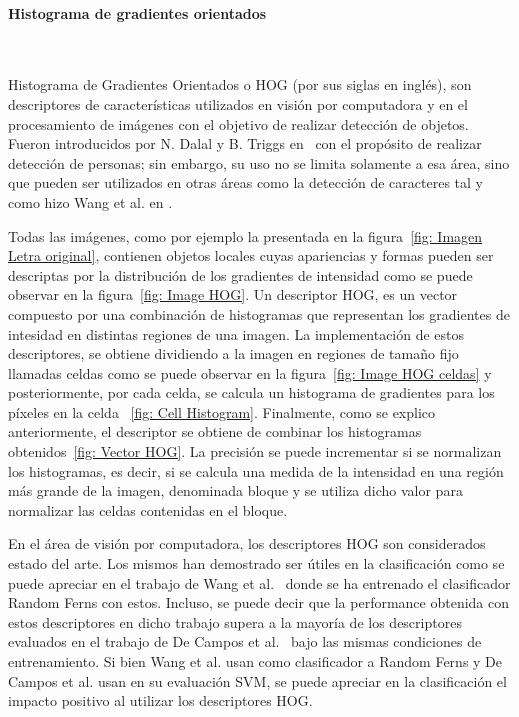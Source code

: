 \paragraph{Histograma de gradientes orientados} ~\\
\label{subsection:hog}

	Histograma de Gradientes Orientados o HOG (por sus siglas en inglés), son descriptores de características utilizados en visión por computadora y en el procesamiento de imágenes con el objetivo de realizar detección de objetos. Fueron introducidos por N. Dalal y B. Triggs en~\cite{DT05} con el propósito de realizar detección de personas; sin embargo, su uso no se limita solamente a esa área, sino que pueden ser utilizados en otras áreas como la detección de caracteres tal y como hizo Wang et al. en \cite{wang}.
	
	Todas las imágenes, como por ejemplo la presentada en la figura~\ref{fig: Imagen Letra original}, contienen objetos locales cuyas apariencias y formas pueden ser descriptas por la distribución de los gradientes de intensidad como se puede observar en la figura~\ref{fig: Image HOG}.	Un descriptor HOG, es un vector compuesto por una combinación de histogramas que representan los gradientes de intesidad en distintas regiones de una imagen. La implementación de estos descriptores, se obtiene dividiendo a la imagen en regiones de tamaño fijo llamadas celdas como se puede observar en la figura~\ref{fig: Image HOG celdas} y posteriormente, por cada celda, se calcula un histograma de gradientes para los píxeles en la celda ~\ref{fig: Cell Histogram}. Finalmente, como se explico anteriormente, el descriptor se obtiene de combinar los histogramas obtenidos~\ref{fig: Vector HOG}. La precisión se puede incrementar si se normalizan los histogramas, es decir, si se calcula una medida de la intensidad en una región más grande de la imagen, denominada bloque y se utiliza dicho valor para normalizar las celdas contenidas en el bloque.
	
	
	En el área de visión por computadora, los descriptores HOG son considerados estado del arte. Los mismos han demostrado ser útiles en la clasificación como se puede apreciar en el trabajo de Wang et al.~\cite{wang} donde se ha entrenado el clasificador Random Ferns con estos. Incluso, se puede decir que la performance obtenida con estos descriptores en dicho trabajo supera a la mayoría de los descriptores evaluados en el trabajo de De Campos et al.~\cite{dCBV09} bajo las mismas condiciones de entrenamiento. Si bien Wang et al. usan como clasificador a Random Ferns y De Campos et al. usan en su evaluación SVM, se puede apreciar en la clasificación el impacto positivo al utilizar los descriptores HOG.
	
